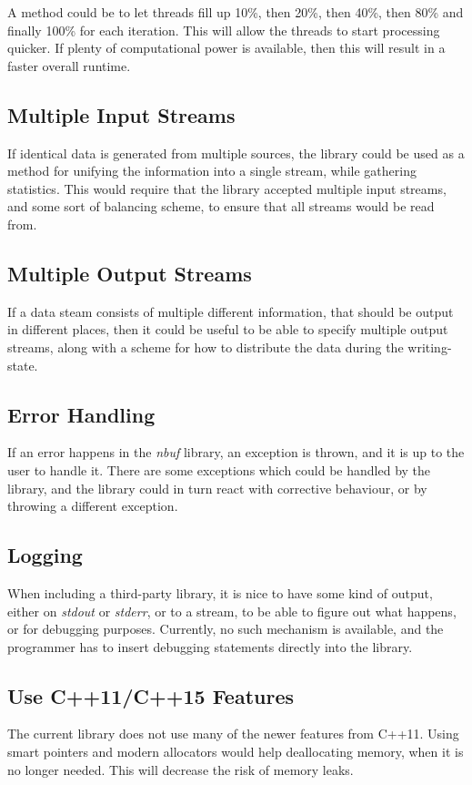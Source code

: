 \documentclass[a4paper]{article}
\newcommand{\nbuf}{\textit{nbuf} }
\begin{document}
A method could be to let threads fill up 10\%, then 20\%, then 40\%, then 80\% and finally 100\% for each iteration. This will allow the threads to start processing quicker. If plenty of computational power is available, then this will result in a faster overall runtime.


\subsection{Multiple Input Streams}
If identical data is generated from multiple sources, the library could be used as a method for unifying the information into a single stream, while gathering statistics. This would require that the library accepted multiple input streams, and some sort of balancing scheme, to ensure that all streams would be read from.


\subsection{Multiple Output Streams}
If a data steam consists of multiple different information, that should be output in different places, then it could be useful to be able to specify multiple output streams, along with a scheme for how to distribute the data during the writing-state.


\subsection{Error Handling}
If an error happens in the \nbuf library, an exception is thrown, and it is up to the user to handle it. There are some exceptions which could be handled by the library, and the library could in turn react with corrective behaviour, or by throwing a different exception.\\

\subsection{Logging}
When including a third-party library, it is nice to have some kind of output, either on \textit{stdout} or \textit{stderr}, or to a stream, to be able to figure out what happens, or for debugging purposes. Currently, no such mechanism is available, and the programmer has to insert debugging statements directly into the library.


\subsection{Use C++11/C++15 Features}
The current library does not use many of the newer features from C++11. Using smart pointers and modern allocators would help deallocating memory, when it is no longer needed. This will decrease the risk of memory leaks.


\newpage


\end{document}
